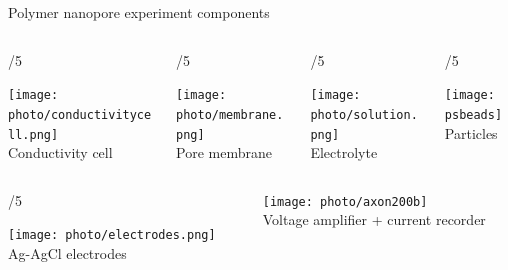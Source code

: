 

\begin{frame}[c]{Polymer nanopore experiment components}



	\begin{columns}[t]
		\begin{column}[T]{\paperwidth/5}
			{\centering
				\texttt{[image: photo/conductivitycell.png]} \\
				{\footnotesize Conductivity cell}
				\par
			}
		\end{column}
		
		
		\begin{column}[T]{\paperwidth/5}
			{\centering
				\texttt{[image: photo/membrane.png]} \\
				{\footnotesize Pore membrane}
				\par
			}
		\end{column}
		
		
		
		\begin{column}[T]{\paperwidth/5}
			{\centering
				\texttt{[image: photo/solution.png]} \\
				{\footnotesize Electrolyte}
				\par
			}
		\end{column}

		
		

		
		\begin{column}[T]{\paperwidth/5}
			{\centering
				\texttt{[image: psbeads]} \\
				{\footnotesize Particles}
				\par
			}
		\end{column}

	\end{columns}
	
	\vspace{1cm}
	
	\begin{columns}[t]
		\begin{column}[T]{\paperwidth/5}
			{\centering
				\texttt{[image: photo/electrodes.png]} \\
				{\footnotesize Ag-AgCl electrodes}
				\par
			}
		\end{column}
		
		
		\begin{column}[T]{.6\paperwidth}
			{\centering
				\texttt{[image: photo/axon200b]} \\
				Voltage amplifier + current recorder
				\par
			}
		\end{column}
	

	\end{columns}


\end{frame}



